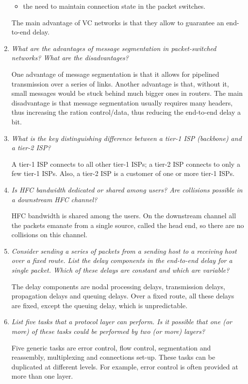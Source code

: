\begin{enumerate}
\begin{itemize}
     \item the need to maintain connection state in the packet
       switches.

   \end{itemize}
   The main advantage of VC networks is that they allow to guarantee
   an end-to-end delay.

  \item \emph{What are the advantages of message segmentation in
    packet-switched networks? What are the disadvantages?}

  One advantage of message segmentation is that it allows for
  pipelined transmission over a series of links. Another advantage is
  that, without it, small messages would be stuck behind much bigger
  ones in routers. The main disadvantage is that message segmentation
  usually requires many headers, thus increasing the ration
  control/data, thus reducing the end-to-end delay a bit.

  \item \emph{What is the key distinguishing difference between a
    tier-1 ISP (backbone) and a tier-2 ISP?}

  A tier-1 ISP connects to all other tier-1 ISPs; a tier-2 ISP
  connects to only a few tier-1 ISPs. Also, a tier-2 ISP is a customer
  of one or more tier-1 ISPs.

  \item \emph{Is HFC bandwidth dedicated or shared among users? Are
    collisions possible in a downstream HFC channel?}

  HFC bandwidth is shared among the users. On the downstream channel
  all the packets emanate from a single source, called the head end,
  so there are no collisions on this channel.

  \item \emph{Consider sending a series of packets from a sending host
    to a receiving host over a fixed route. List the delay components
    in the end-to-end delay for a single packet. Which of these delays
    are constant and which are variable?}

  The delay components are nodal processing delays, transmission
  delays, propagation delays and queuing delays. Over a fixed route,
  all these delays are fixed, except the queuing delay, which is
  unpredictable.

  \item \emph{List five tasks that a protocol layer can perform. Is it
    possible that one (or more) of these tasks could be performed by
    two (or more) layers?}
   
  Five generic tasks are error control, flow control, segmentation and
  reassembly, multiplexing and connections set-up. These tasks can be
  duplicated at different levels. For example, error control is often
  provided at more than one layer.
  

\end{enumerate}

